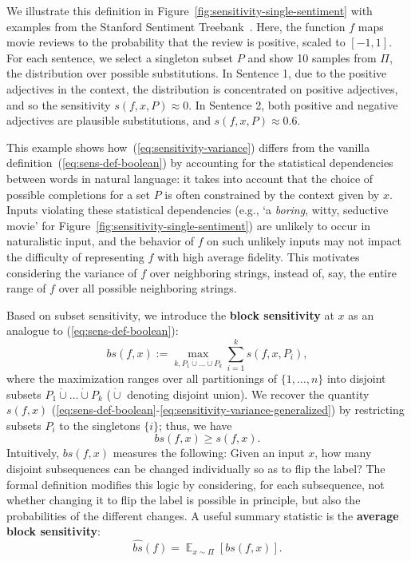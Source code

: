 \documentclass[11pt,a4paper]{article}
\newcommand{\E}{\mathop{\mathbb{E}}}%
\begin{document}
We illustrate this definition in Figure~\ref{fig:sensitivity-single-sentiment} with examples from the Stanford Sentiment Treebank~\citep{socher2013recursive}.
Here, the function $f$ maps movie reviews to the probability that the review is positive, scaled to $[-1, 1]$. %
For each sentence, we select a singleton subset $P$ and show 10 samples from $\Pi$, the distribution over possible substitutions.
In Sentence 1, due to the positive adjectives in the context, the distribution is concentrated on positive adjectives, and so the sensitivity $s(f,x,P) \approx 0$.
In Sentence 2, both positive and negative adjectives are plausible substitutions, and $s(f,x,P) \approx 0.6$.



This example shows how~(\ref{eq:sensitivity-variance}) differs from the vanilla definition~(\ref{eq:sens-def-boolean}) by accounting for the statistical dependencies between words in natural language:
it takes into account that the choice of possible completions for a set $P$ is often constrained by the context given by $x$.
Inputs violating these statistical dependencies (e.g., `a \emph{boring}, witty, seductive movie' for Figure~\ref{fig:sensitivity-single-sentiment}) are unlikely to occur in naturalistic input, and the behavior of $f$ on such unlikely inputs may not impact the difficulty of representing $f$ with high average fidelity.
This motivates considering the variance of $f$ over neighboring strings, instead of, say, the entire range of $f$ over all possible neighboring strings.



Based on subset sensitivity, we introduce the \textbf{block sensitivity} at $x$ as an analogue to (\ref{eq:sens-def-boolean}):
\begin{equation}\label{eq:block-sens}
    bs(f,x) := \max_{k, P_1 \dot\cup \dots \dot\cup P_k} \sum_{i=1}^k s(f,x,P_i),
\end{equation}
where the maximization ranges over all partitionings of $\{1, \dots, n\}$ into disjoint subsets $P_1 \dot\cup \dots \dot\cup P_k$ ($\dot\cup$ denoting disjoint union).
We recover the quantity $s(f,x)$ (\ref{eq:sens-def-boolean}-\ref{eq:sensitivity-variance-generalized}) by restricting subsets $P_i$ to the singletons $\{i\}$; thus, we have
\begin{equation}
    bs(f,x) \ge s(f,x).
\end{equation}
Intuitively, $bs(f,x)$ measures the following:
Given an input $x$, how many disjoint subsequences can be changed individually so as to flip the label?
The formal definition modifies this logic by considering, for each subsequence, not whether changing it to flip the label is possible in principle, but also the probabilities of the different changes.
A useful summary statistic is the \textbf{average block sensitivity}:
\begin{equation}
\widehat{bs}(f) = \E_{x \sim \Pi} \left[ bs(f,x) \right].
\end{equation}
\end{document}
